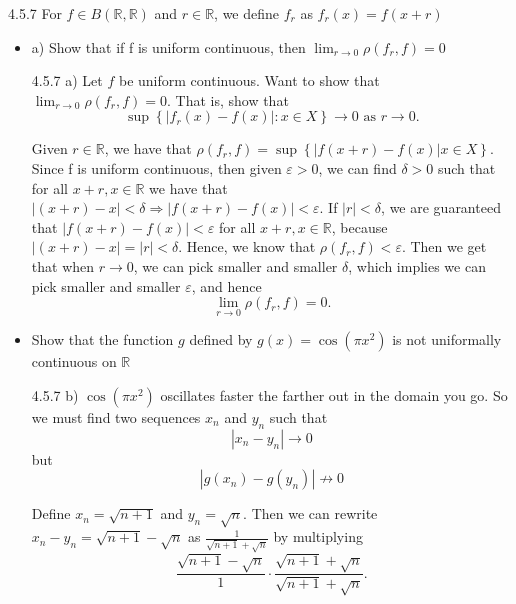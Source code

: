\documentclass[a4paper,norsk]{article}
\renewcommand{\epsilon}{\varepsilon}
\begin{document}
\begin{oppgavebox}{4.5.7}{}
For $ f \in B \left( \mathbb{R}, \mathbb{R} \right)  $ and $ r \in \mathbb{R} $, we define $ f_r $ as $ f_r(x) = f(x+r) $ 
\begin{itemize}
  \item a) Show that if f is uniform continuous, then $ \lim_{r \to 0} \rho \left( f_r, f \right) =0 $ 
  \begin{proofbox}{4.5.7 a)}{}
    Let $ f $ be uniform continuous. Want to show that $ \lim_{r \to 0} \rho \left( f_r, f \right) = 0  $. That is, show that 
    \[
         \sup \left\{ \left| f_r(x) - f(x) \right| : x \in X \right\} \to 0  \text{ as } r \to 0.
    \]
    
    Given $ r \in \mathbb{R} $, we have that  $ \rho \left( f_r, f \right) =  \sup \left\{ \left| f(x+r) - f(x) \right| x \in X \right\}   $. Since f is uniform continuous, then given $ \epsilon > 0 $, we can find $  \delta > 0 $ such that for all $ x+r, x \in \mathbb{R} $  we have that $ \left| \left( x+r \right) - x   \right| < \delta \Rightarrow \left| f(x+r) - f(x) \right| < \epsilon    $. If $ \left| r \right| < \delta  $, we are guaranteed that $ \left| f(x+r) - f(x) \right| < \epsilon  $ for all $ x+r, x \in \mathbb{R} $, because $ \left| \left( x+r \right) - x \right| = \left| r \right| < \delta $. Hence, we know that $ \rho \left( f_r, f \right) < \epsilon  $. Then we get that when $ r \to 0  $, we can pick smaller and smaller $ \delta  $, which implies we can pick smaller and smaller $ \epsilon  $, and hence
    \[
        \lim_{r \to 0} \rho \left( f_r, f \right) = 0.
    \]
    
  \end{proofbox}
  \item Show that the function $ g $ defined by $ g(x) = \cos(\pi x^2  )   $ is not uniformally continuous on $ \mathbb{R} $
  \begin{proofbox}{4.5.7 b)}{}
    $ \cos( \pi x^2)   $ oscillates faster the farther out in the domain you go. So we must find two sequences $ x_n $ and $ y_n $ such that 
    \[
        \left| x_n - y_n \right| \to 0 
    \]
    but
    \[
        \left| g(x_n) - g(y_n) \right| \not \to 0
    \]

    Define $ x_n = \sqrt{ n+1 } $ and $ y_n = \sqrt{ n } $. Then we can rewrite $ x_n - y_n  = \sqrt{ n+1 } - \sqrt{ n } $ as $ \frac{ 1 }{ \sqrt{ n+1 } + \sqrt{ n } } $ by multiplying 
    \[
        \frac{ \sqrt{ n+1 } - \sqrt{ n } }{ 1 } \cdot \frac{ \sqrt{ n+1 } + \sqrt{ n } }{ \sqrt{ n+1 } + \sqrt{ n } }.
    \]
    

\end{proofbox}
\end{itemize}
\end{oppgavebox}
\end{document}
